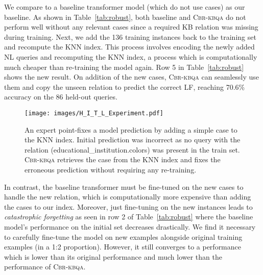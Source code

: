 \documentclass[11pt]{article}
\newcommand{\alg}{\textsc{Cbr-kbqa}\xspace}
\begin{document}
We compare to a baseline transformer model (which do not use cases) as our baseline. As shown in Table~\ref{tab:robust}, both baseline and \alg do not perform well without any relevant cases since a required KB relation was missing during training. Next, we add the 136 training instances back to the training set and recompute the KNN index. This process involves encoding the newly added NL queries and recomputing the KNN index, a process which is computationally much cheaper than re-training the model again. Row 5 in Table~\ref{tab:robust} shows the new result. On addition of the new cases, \alg can seamlessly use them and copy the unseen relation to predict the correct LF, reaching 70.6\% accuracy on the 86 held-out queries. 

\begin{figure}
    \centering
\texttt{[image: images/H\_I\_T\_L\_Experiment.pdf]}
    \vspace{-5mm}
    \caption{\small An expert point-fixes a model prediction by adding a simple case to the KNN index. Initial prediction was incorrect as no query with the relation (educational\_institution.colors) was present in the train set. \alg retrieves the case from the KNN index and fixes the erroneous prediction without requiring any re-training.}
    \label{fig:hitl_fig}
\end{figure}




In contrast, the baseline transformer must be fine-tuned on the new cases to handle the new relation, which is computationally more expensive than adding the cases to our index. Moreover, just fine-tuning on the new instances leads to \emph{catastrophic forgetting} as seen in row 2 of Table~\ref{tab:robust} where the baseline model's performance on the initial set decreases drastically. We find it necessary to carefully fine-tune the model on new examples alongside original training examples (in a 1:2 proportion). However, it still converges to a performance which is lower than its original performance and much lower than the performance of \alg.
\end{document}
